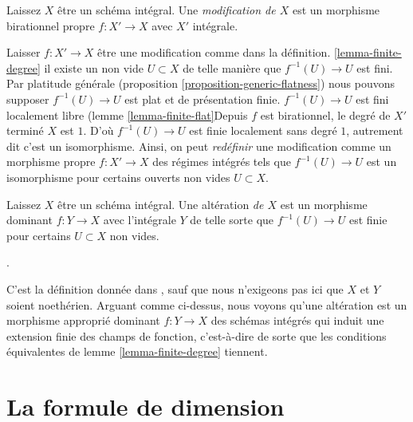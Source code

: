 \begin{definition}

\label{definition-modification}
Laissez $X$ être un schéma intégral. Une {\it modification de $X$} est un morphisme birationnel propre $f : X' \to X$ avec $X'$ intégrale.
\end{definition}

\noindent

Laisser $f : X' \to X$ être une modification comme dans la définition. \ref{lemma-finite-degree} il existe un non vide $U \subset X$ de telle manière que $f^{-1}(U) \to U$ est fini. Par platitude générale (proposition \ref{proposition-generic-flatness}) nous pouvons supposer $f^{-1}(U) \to U$ est plat et de présentation finie. $f^{-1}(U) \to U$ est fini localement libre (lemme \ref{lemma-finite-flat}Depuis $f$ est birationnel, le degré de $X'$ terminé $X$ est $1$. D'où $f^{-1}(U) \to U$ est finie localement sans degré $1$, autrement dit c'est un isomorphisme. Ainsi, on peut {\it redéfinir} une modification comme un morphisme propre $f : X' \to X$ des régimes intégrés tels que $f^{-1}(U) \to U$ est un isomorphisme pour certains ouverts non vides
$U \subset X$.

\begin{definition}

\label{definition-alteration}

\begin{reference}
\cite[définition 2.20]{altérations}
\end{reference}
Laissez $X$ être un schéma intégral. Une altération {\it de $X$} est un morphisme dominant $f : Y \to X$ avec l'intégrale $Y$ de telle sorte que $f^{-1}(U) \to U$ est finie pour certains $U \subset X$ non vides.
\end{definition}
.

\noindent
C'est la définition donnée dans \cite{alterations}, sauf que nous n'exigeons pas ici que $X$ et $Y$ soient noethérien. Arguant comme ci-dessus, nous voyons qu'une altération est un morphisme approprié dominant $f : Y \to X$ des schémas intégrés qui induit une extension finie des champs de fonction, c'est-à-dire de sorte que les conditions équivalentes de lemme \ref{lemma-finite-degree} tiennent.



\section{La formule de dimension}
\label{section-dimension-formula}

